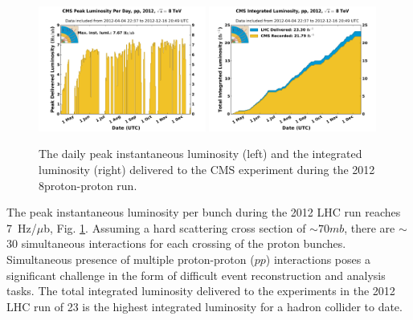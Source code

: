 \begin{figure}[htbp]
\centering
\includegraphics[width=0.49\textwidth]{plots/intro/peak_lumi.pdf}
\includegraphics[width=0.49\textwidth]{plots/intro/int_lumi.pdf}
\caption{The daily peak instantaneous luminosity (left) and the integrated luminosity (right)
 delivered to the CMS experiment during the 2012 8\TeV proton-proton run.\label{fig:lumi}}
\end{figure}

The peak instantaneous luminosity per bunch during the 2012 LHC run 
 reaches 7~Hz/$\mu$b, Fig. \ref{fig:lumi}. 
Assuming a hard scattering cross section of $\sim70mb$, there are $\sim$30 simultaneous interactions 
for each 
crossing of the proton bunches. Simultaneous presence of multiple proton-proton ($pp$) interactions
 poses a significant challenge in the form of difficult event reconstruction and analysis tasks.
 The total integrated luminosity 
delivered to the experiments in the 2012 LHC run of 23 \fbinv 
is the highest integrated luminosity for a hadron collider 
to date.
